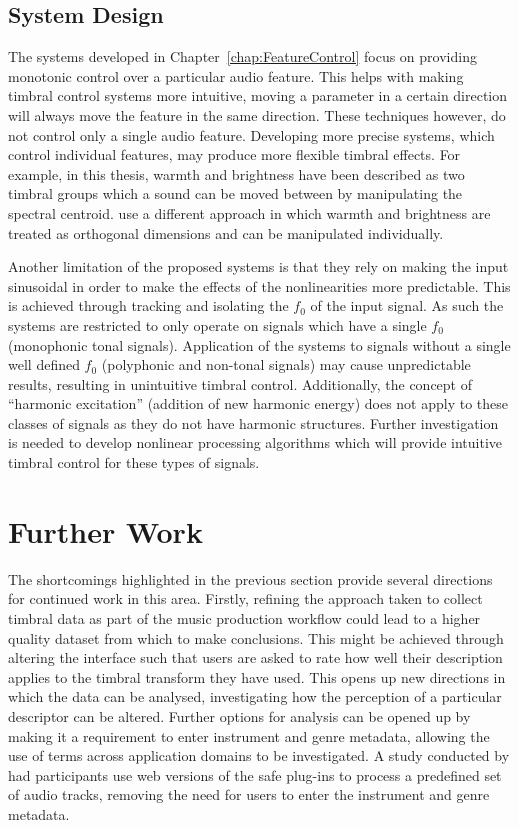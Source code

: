 	\subsection{System Design}
	\label{sec:Conclusion-Critique-SystemDesign}
		The systems developed in Chapter~\ref{chap:FeatureControl} focus on providing monotonic control over a
		particular audio feature. This helps with making timbral control systems more intuitive, moving a parameter
		in a certain direction will always move the feature in the same direction. These techniques however, do not
		control only a single audio feature. Developing more precise systems, which control individual features, may
		produce more flexible timbral effects. For example, in this thesis, warmth and brightness have been
		described as two timbral groups which a sound can be moved between by manipulating the spectral centroid.
		\cite{zacharakis2011an} use a different approach in which warmth and brightness are treated as orthogonal
		dimensions and can be manipulated individually.

		Another limitation of the proposed systems is that they rely on making the input sinusoidal in order to make
		the effects of the nonlinearities more predictable. This is achieved through tracking and isolating the
		$f_{0}$ of the input signal. As such the systems are restricted to only operate on signals which have a
		single $f_{0}$ (monophonic tonal signals). Application of the systems to signals without a single well
		defined $f_{0}$ (polyphonic and non-tonal signals) may cause unpredictable results, resulting in unintuitive
		timbral control. Additionally, the concept of ``harmonic excitation'' (addition of new harmonic energy) does
		not apply to these classes of signals as they do not have harmonic structures. Further investigation is
		needed to develop nonlinear processing algorithms which will provide intuitive timbral control for these
		types of signals.

\section{Further Work}
\label{sec:Conclusion-FurtherWork}
	The shortcomings highlighted in the previous section provide several directions for continued work in this area.
	Firstly, refining the approach taken to collect timbral data as part of the music production workflow could lead to
	a higher quality dataset from which to make conclusions. This might be achieved through altering the interface such
	that users are asked to rate how well their description applies to the timbral transform they have used. This opens
	up new directions in which the data can be analysed, investigating how the perception of a particular descriptor can
	be altered. Further options for analysis can be opened up by making it a requirement to enter instrument and genre
	metadata, allowing the use of terms across application domains to be investigated. A study conducted by
	\citet{stasis2017audio} had participants use web versions of the \acrshort{safe} plug-ins to process a predefined
	set of audio tracks, removing the need for users to enter the instrument and genre metadata.

